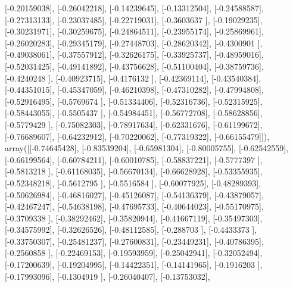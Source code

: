 \documentclass{article}
\begin{document}
       [-0.20159038],
       [-0.26042218],
       [-0.14239645],
       [-0.13312504],
       [-0.24588587],
       [-0.27313133],
       [-0.23037485],
       [-0.22719031],
       [-0.3603637 ],
       [-0.19029235],
       [-0.30231971],
       [-0.30259675],
       [-0.24864511],
       [-0.23955174],
       [-0.25869961],
       [-0.26020283],
       [-0.29345179],
       [-0.27448703],
       [-0.28620342],
       [-0.4300901 ],
       [-0.49038061],
       [-0.37557912],
       [-0.32626175],
       [-0.33925737],
       [-0.48959016],
       [-0.52031425],
       [-0.49141892],
       [-0.43756628],
       [-0.51100404],
       [-0.38759736],
       [-0.4240248 ],
       [-0.40923715],
       [-0.4176132 ],
       [-0.42369114],
       [-0.43540384],
       [-0.44351015],
       [-0.45347059],
       [-0.46210398],
       [-0.47310282],
       [-0.47994808],
       [-0.52916495],
       [-0.5769674 ],
       [-0.51334406],
       [-0.52316736],
       [-0.52315925],
       [-0.58443055],
       [-0.5505437 ],
       [-0.54984451],
       [-0.56772708],
       [-0.58628856],
       [-0.5779429 ],
       [-0.75082303],
       [-0.78917634],
       [-0.62331676],
       [-0.61199672],
       [-0.76689607],
       [-0.64232912],
       [-0.70220062],
       [-0.77319322],
       [-0.66155479]]), array([[-0.74645428],
       [-0.83539204],
       [-0.65981304],
       [-0.80005755],
       [-0.62542559],
       [-0.66199564],
       [-0.60784211],
       [-0.60010785],
       [-0.58837221],
       [-0.5777397 ],
       [-0.5813218 ],
       [-0.61168035],
       [-0.56670134],
       [-0.66628928],
       [-0.53355935],
       [-0.52348218],
       [-0.5612795 ],
       [-0.5516584 ],
       [-0.60077925],
       [-0.48289393],
       [-0.50626984],
       [-0.46816027],
       [-0.45126087],
       [-0.54136379],
       [-0.43879057],
       [-0.42467247],
       [-0.54638198],
       [-0.47695733],
       [-0.40644023],
       [-0.55170975],
       [-0.3709338 ],
       [-0.38292462],
       [-0.35820944],
       [-0.41667119],
       [-0.35497303],
       [-0.34575992],
       [-0.32626526],
       [-0.48112585],
       [-0.288703  ],
       [-0.4433373 ],
       [-0.33750307],
       [-0.25481237],
       [-0.27600831],
       [-0.23449231],
       [-0.40786395],
       [-0.2560858 ],
       [-0.22469153],
       [-0.19593959],
       [-0.25042941],
       [-0.32052494],
       [-0.17200639],
       [-0.19204995],
       [-0.14422351],
       [-0.14141965],
       [-0.1916203 ],
       [-0.17993096],
       [-0.1304919 ],
       [-0.26040407],
       [-0.13753032],
\end{document}
